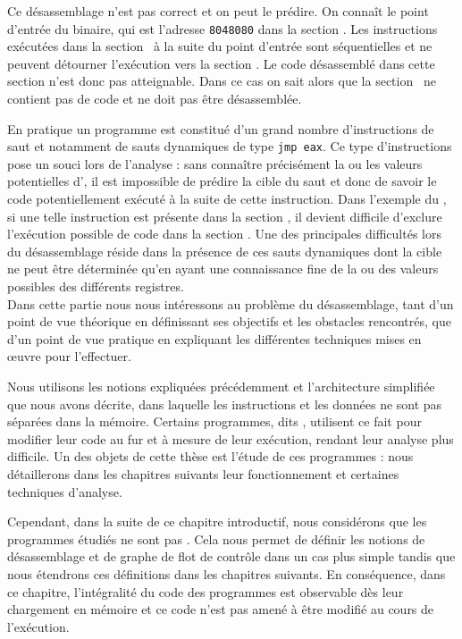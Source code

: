 Ce désassemblage n'est pas correct et on peut le prédire. 
On connaît le point d'entrée du binaire, qui est l'adresse \texttt{8048080} dans la section \ptext.
Les instructions exécutées dans la section \ptext\ à la suite du point d'entrée sont séquentielles et ne peuvent détourner l'exécution vers la section \pdata. 
Le code désassemblé dans cette section n'est donc pas atteignable. Dans ce cas on sait alors que la section \pdata\ ne contient pas de code et ne doit pas être désassemblée.



En pratique un programme est constitué d'un grand nombre d'instructions de saut et notamment de sauts dynamiques de type \texttt{jmp eax}.
Ce type d'instructions pose un souci lors de l'analyse : sans connaître précisément la ou les valeurs potentielles d'\eax, il est impossible de prédire la cible du saut et donc de savoir le code potentiellement exécuté à la suite de cette instruction.
Dans l'exemple du \helloworld, si une telle instruction est présente dans la section \ptext, il devient difficile d'exclure l'exécution possible de code dans la section \pdata.
Une des principales difficultés lors du désassemblage réside dans la présence de ces sauts dynamiques dont la cible ne peut être déterminée qu'en ayant une connaissance fine de la ou des valeurs possibles des différents registres.
\\

Dans cette partie nous nous intéressons au problème du désassemblage, tant d'un point de vue théorique en définissant ses objectifs et les obstacles rencontrés, que d'un point de vue pratique en expliquant les différentes techniques mises en \oe uvre pour l'effectuer.

Nous utilisons les notions expliquées précédemment et l'architecture simplifiée que nous avons décrite, dans laquelle les instructions et les données ne sont pas séparées dans la mémoire.
Certains programmes, dits \sms, utilisent ce fait pour modifier leur code au fur et à mesure de leur exécution, rendant leur analyse plus difficile. Un des objets de cette thèse est l'étude de ces programmes : nous détaillerons dans les chapitres suivants leur fonctionnement et certaines techniques d'analyse.

Cependant, dans la suite de ce chapitre introductif, nous considérons que les programmes étudiés ne sont pas \sms. 
Cela nous permet de définir les notions de désassemblage et de graphe de flot de contrôle dans un cas plus simple tandis que nous étendrons ces définitions dans les chapitres suivants.
En conséquence, dans ce chapitre, l'intégralité du code des programmes est observable dès leur chargement en mémoire et ce code n'est pas amené à être modifié au cours de l'exécution.

